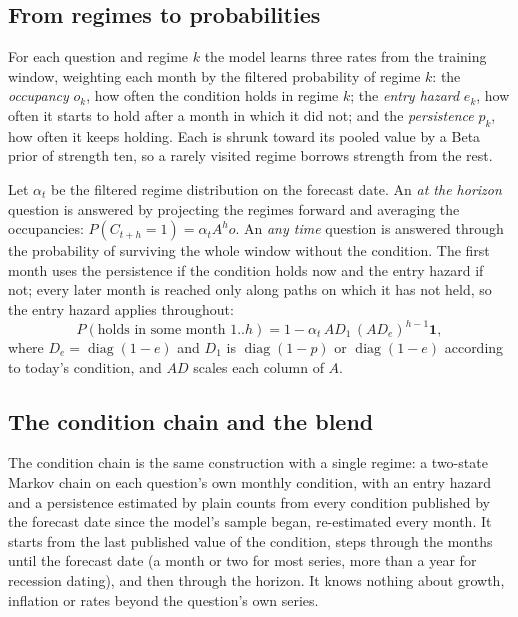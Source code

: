 \documentclass[11pt]{article}
\begin{document}
\subsection{From regimes to probabilities}\label{sec:composition}

For each question and regime $k$ the model learns three rates from the training window, weighting each
month by the filtered probability of regime $k$: the \emph{occupancy} $o_k$, how often the condition
holds in regime $k$; the \emph{entry hazard} $e_k$, how often it starts to hold after a month in which it
did not; and the \emph{persistence} $p_k$, how often it keeps holding. Each is shrunk toward its pooled
value by a Beta prior of strength ten, so a rarely visited regime borrows strength from the rest.

Let $\alpha_t$ be the filtered regime distribution on the forecast date. An \emph{at the horizon}
question is answered by projecting the regimes forward and averaging the occupancies:
$P(C_{t+h} = 1) = \alpha_t A^{h} o$. An \emph{any time} question is answered through the probability of
surviving the whole window without the condition. The first month uses the persistence if the
condition holds now and the entry hazard if not; every later month is reached only along paths on which
it has not held, so the entry hazard applies throughout:
\begin{equation}
  P(\text{holds in some month } 1..h) = 1 - \alpha_t\, A D_1 \,(A D_e)^{h-1} \mathbf{1},
\end{equation}
where $D_e = \operatorname{diag}(1 - e)$ and $D_1$ is $\operatorname{diag}(1-p)$ or $\operatorname{diag}(1-e)$
according to today's condition, and $A D$ scales each column of $A$.

\subsection{The condition chain and the blend}\label{sec:blend}

The condition chain is the same construction with a single regime: a two-state Markov chain on each
question's own monthly condition, with an entry hazard and a persistence estimated by plain counts from
every condition published by the forecast date since the model's sample began, re-estimated every month.
It starts from the last
published value of the condition, steps through the months until the forecast date (a month or two for
most series, more than a year for recession dating), and then through the horizon. It knows nothing
about growth, inflation or rates beyond the question's own series.
\end{document}
